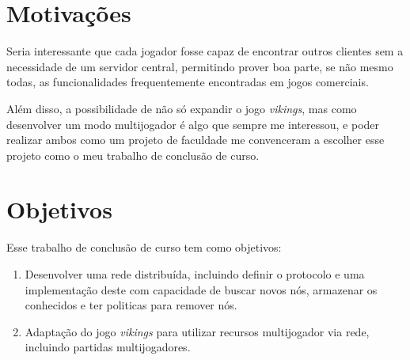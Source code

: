 \section{Motivações}
\label{sec:intr:motivacoes}

Seria interessante que cada jogador fosse capaz de encontrar outros clientes
sem a necessidade de um servidor central, permitindo prover boa parte, se não
mesmo todas, as funcionalidades frequentemente encontradas em jogos comerciais.

Além disso, a possibilidade de não só expandir o jogo \textit{vikings}, mas como
desenvolver um modo multijogador é algo que sempre me interessou, e poder
realizar ambos como um projeto de faculdade me convenceram a escolher esse
projeto como o meu trabalho de conclusão de curso.

\section{Objetivos}
\label{sec:intr:objetivos}

Esse trabalho de conclusão de curso tem como objetivos:

\begin{enumerate}
  \item Desenvolver uma rede distribuída, incluindo definir o protocolo e uma implementação deste com capacidade de 
    buscar novos nós, armazenar os conhecidos e ter politicas para remover nós.
    
  \item Adaptação do jogo \textit{vikings} para utilizar recursos multijogador via rede, incluindo partidas
    multijogadores.
\end{enumerate}






